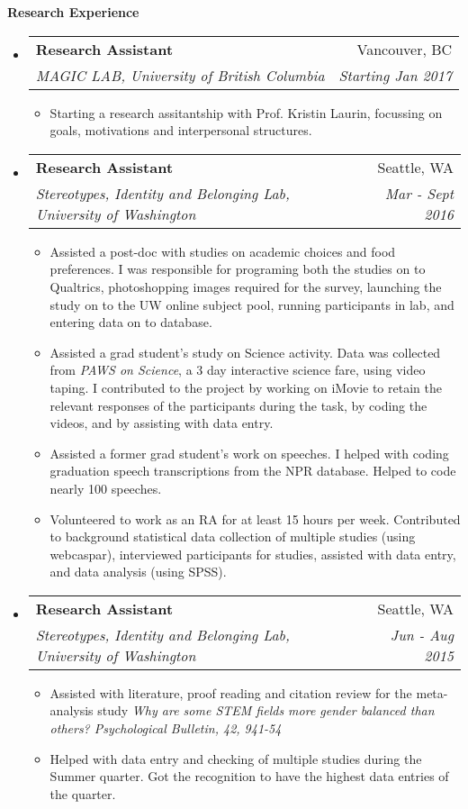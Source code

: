\documentclass[letterpaper,11pt]{article}
\makeatletter
\newcommand{\resheading}[1]{{\large \colorbox{mygrey}{\begin{minipage}{\textwidth}{\textbf{#1 \vphantom{p\^{E}}}}\end{minipage}}}}
\newcommand{\ressubheading}[4]{
\begin{tabular*}{7.0in}{l@{\extracolsep{\fill}}r}
      \textbf{#1} & #2 \\
            \textit{#3} & \textit{#4} \\
\end{tabular*}\vspace{-6pt}}
\makeatother
\begin{document}
\resheading{Research Experience}
\begin{itemize}

    \item
        \ressubheading{Research Assistant}{Vancouver, BC}{MAGIC LAB, University of British Columbia}{Starting Jan 2017}
        \begin{itemize}
            \item{Starting a research assitantship with Prof. Kristin Laurin, focussing on goals, motivations and interpersonal structures.}
         \end{itemize}
    \item
        \ressubheading{Research Assistant}{Seattle, WA}{Stereotypes, Identity and Belonging Lab, University of Washington}{Mar - Sept 2016}
        \begin{itemize}
            \item{Assisted a post-doc with studies on academic choices and food preferences. I was responsible for programing both the studies on to \textsf{Qualtrics}, photoshopping images required for the survey, launching the study on to the UW online subject pool, running participants in lab, and entering data on to database.}
            \item{Assisted a grad student's study on Science activity. Data was collected from \textit{PAWS on Science}, a 3 day interactive science fare, using video taping. I contributed to the project by working on iMovie to retain the relevant responses of the participants during the task, by coding the videos, and by assisting with data entry.}
          \item{Assisted a former grad student's work on speeches. I helped with coding graduation speech transcriptions from the NPR database. Helped to code nearly 100 speeches.}
          \item{Volunteered to work as an RA for at least 15 hours per week. Contributed to background statistical data collection of multiple studies (using \textsf{webcaspar}), interviewed participants for studies, assisted with data entry, and data analysis (using \textsf{SPSS}).} 
         \end{itemize}
    \item
        \ressubheading{Research Assistant}{Seattle, WA}{Stereotypes, Identity and Belonging Lab, University of Washington}{Jun - Aug 2015}
        \begin{itemize}
            \item{Assisted with literature, proof reading and citation review for the meta-analysis study \textit{Why are some STEM fields more gender balanced than others? Psychological Bulletin, 42, 941-54}}
             \item{Helped with data entry and checking of multiple studies during the Summer quarter. Got the recognition to have the highest data entries of the quarter.} 
         \end{itemize}              
\end{itemize}
\end{document}
